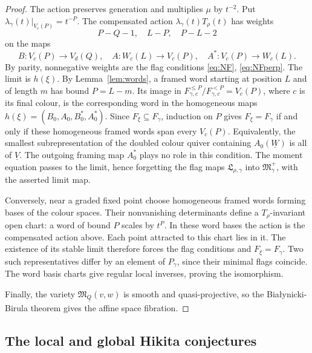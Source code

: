 \documentclass[11pt,reqno]{amsart}
\theoremstyle{definition}
\theoremstyle{remark}
\def\dV{\underline V}
\def\dW{\underline W}
\def\dQ{\underline Q}
\def\M{\mathfrak M}
\begin{document}
\begin{proof}
The action preserves generation and multiplies $\mu$ by $t^{-2}$.
Put $\lambda_\gamma(t)|_{V_c(P)}=t^{-P}$. The compensated action
$\lambda_\gamma(t)T_\rho(t)$ has weights
\[
 P-Q-1,\quad L-P,\quad P-L-2
\]
on the maps
$$B:V_c(P)\to V_d(Q)
,\quad
A:W_c(L)\to V_c(P)
,\quad
A^*:V_c(P)\to W_c(L).$$
By parity, nonnegative
weights are  the flag conditions \eqref{eq:NF}, \eqref{eq:NFperp}.
The limit is $h(\xi)$. 
By Lemma~\ref{lem:words}, a framed word starting at position $L$
and of length $m$ has bound $P=L-m$. Its image in
$F_{\gamma,c}^{\leqslant P}/F_{\gamma,c}^{<P}=V_c(P)$, where $c$
is its final colour, is the corresponding word in the homogeneous
maps $h(\xi)=(B_0,A_0,B_0^*,A_0^*)$.
Since $F_\xi\subseteq F_\gamma$, induction on $P$ gives
$F_\xi=F_\gamma$ if and only if these homogeneous framed words span
every $V_c(P)$. Equivalently, the smallest subrepresentation of
the doubled colour quiver containing $A_0(\dW)$ is all of $\dV$.
The outgoing framing map $A_0^*$ plays no role in this condition.
The moment equation passes to the limit, hence forgetting the flag maps
$\mathfrak L_{\rho,\gamma}$ into $\mathfrak M_\gamma^+$, with the
asserted limit map.

Conversely, near a graded fixed point choose homogeneous framed
words forming bases of the colour spaces. Their nonvanishing
determinants define a $T_\rho$-invariant open chart: a word
of bound $P$ scales by $t^P$. In these word bases the action is
 the compensated action above. Each point attracted to
this chart lies in it. The existence of its stable limit therefore
forces the flag conditions and $F_\xi=F_\gamma$. Two such
representatives differ by an element of $P_\gamma$, since their
minimal flags coincide. The word basis charts give regular local
inverses, proving the isomorphism. 
 
Finally, the variety $\M_{\dQ}(v,w)$ is smooth and
quasi-projective, so the Bia\l ynicki-Birula theorem
\cite[Thm.~4.1]{BB73} gives the affine space fibration.
\end{proof}









\subsection{The local and global Hikita conjectures}\label{subsec:global-conjecture}
\end{document}
